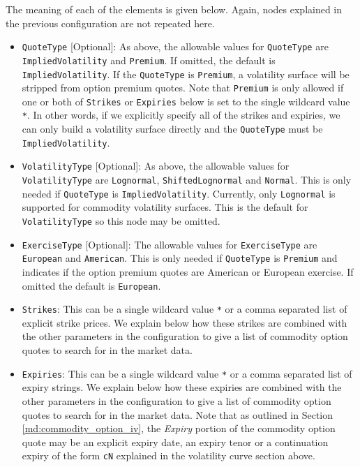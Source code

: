 The meaning of each of the elements is given below. Again, nodes explained in the previous configuration are not repeated here.
\begin{itemize}
\item \lstinline!QuoteType! [Optional]:
As above, the allowable values for \lstinline!QuoteType! are \lstinline!ImpliedVolatility! and \lstinline!Premium!. If omitted, the default is \lstinline!ImpliedVolatility!. If the \lstinline!QuoteType! is \lstinline!Premium!, a volatility surface will be stripped from option premium quotes. Note that \lstinline!Premium! is only allowed if one or both of \lstinline!Strikes! or \lstinline!Expiries! below is set to the single wildcard value \lstinline!*!. In other words, if we explicitly specify all of the strikes and expiries, we can only build a volatility surface directly and the \lstinline!QuoteType! must be \lstinline!ImpliedVolatility!.

\item \lstinline!VolatilityType! [Optional]:
As above, the allowable values for \lstinline!VolatilityType! are \lstinline!Lognormal!, \lstinline!ShiftedLognormal! and \lstinline!Normal!. This is only needed if \lstinline!QuoteType! is \lstinline!ImpliedVolatility!. Currently, only \lstinline!Lognormal! is supported for commodity volatility surfaces. This is the default for \lstinline!VolatilityType! so this node may be omitted.

\item \lstinline!ExerciseType! [Optional]:
The allowable values for \lstinline!ExerciseType! are \lstinline!European! and \lstinline!American!. This is only needed if \lstinline!QuoteType! is \lstinline!Premium! and indicates if the option premium quotes are American or European exercise. If omitted the default is \lstinline!European!.

\item \lstinline!Strikes!:
This can be a single wildcard value \lstinline!*! or a comma separated list of explicit strike prices. We explain below how these strikes are combined with the other parameters in the configuration to give a list of commodity option quotes to search for in the market data.

\item \lstinline!Expiries!:
This can be a single wildcard value \lstinline!*! or a comma separated list of expiry strings. We explain below how these expiries are combined with the other parameters in the configuration to give a list of commodity option quotes to search for in the market data. Note that as outlined in Section \ref{md:commodity_option_iv}, the \textit{Expiry} portion of the commodity option quote may be an explicit expiry date, an expiry tenor or a continuation expiry of the form \lstinline!cN! explained in the volatility curve section above.


\end{itemize}
